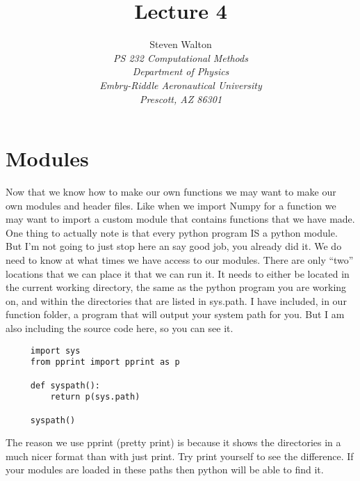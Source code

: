 \documentclass[11pt]{article}   %
\title{Lecture 4}
\author{Steven Walton\\     %
\textit{PS 232 Computational Methods}\\
\textit{Department of Physics}\\
\textit{Embry-Riddle Aeronautical University}\\
\textit{Prescott, AZ   86301}}
\begin{document}
\maketitle

\section*{Modules}
Now that we know how to make our own functions we may want to make our own modules and header files.  Like when we import Numpy for a function we may want to import a custom module that contains functions that we have made.
One thing to actually note is that every python program IS a python module.  But I'm not going to just stop here an say good job, you already did it. We do need to know at what times we have access to our modules.  There are
only ``two'' locations that we can place it that we can run it.  It needs to either be located in the current working directory, the same as the python program you are working on, and within the directories that are listed in sys.path.
I have included, in our function folder, a program that will output your system path for you.  But I am also including the source code here, so you can see it.

\begin{tcolorbox}
   \begin{lstlisting}
     import sys
     from pprint import pprint as p
     
     def syspath():
         return p(sys.path)

     syspath()       
   \end{lstlisting}
\end{tcolorbox}

The reason we use pprint (pretty print) is because it shows the directories in a much nicer format than with just print.  Try print yourself to see the difference. If your modules are loaded in these paths then python will be able to
find it.  

\section*{}
\end{document}
